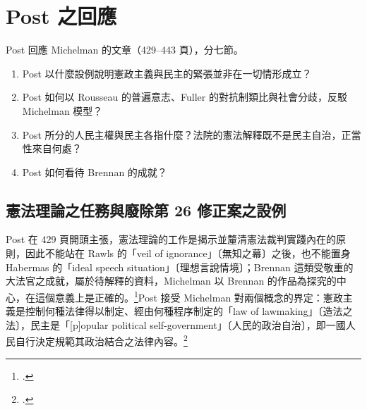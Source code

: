 \chapter{Post 之回應}
\label{ch:60_post}

\begin{qaquestion}
Post 回應 Michelman 的文章（429--443 頁），分七節。
\begin{enumerate}
\tightlist
\item Post 以什麼設例說明憲政主義與民主的緊張並非在一切情形成立？
\item Post 如何以 Rousseau 的普遍意志、Fuller 的對抗制類比與社會分歧，反駁 Michelman 模型？
\item Post 所分的人民主權與民主各指什麼？法院的憲法解釋既不是民主自治，正當性來自何處？
\item Post 如何看待 Brennan 的成就？
\end{enumerate}
\end{qaquestion}

\section{憲法理論之任務與廢除第 26 修正案之設例}
\label{sec:60_post-1}

Post 在 429 頁開頭主張，憲法理論的工作是揭示並釐清憲法裁判實踐內在的原則，因此不能站在 Rawls 的「veil of ignorance」〔無知之幕〕之後，也不能置身 Habermas 的「ideal speech situation」〔理想言說情境〕；Brennan 這類受敬重的大法官之成就，屬於待解釋的資料，Michelman 以 Brennan 的作品為探究的中心，在這個意義上是正確的。\footcite[429 \& nn.1--2]{post1998}Post 接受 Michelman 對兩個概念的界定：憲政主義是控制何種法律得以制定、經由何種程序制定的「law of lawmaking」〔造法之法〕，民主是「[p]opular political self-government」〔人民的政治自治〕，即一國人民自行決定規範其政治結合之法律內容。\footcite[430 \& nn.5--6]{post1998}

